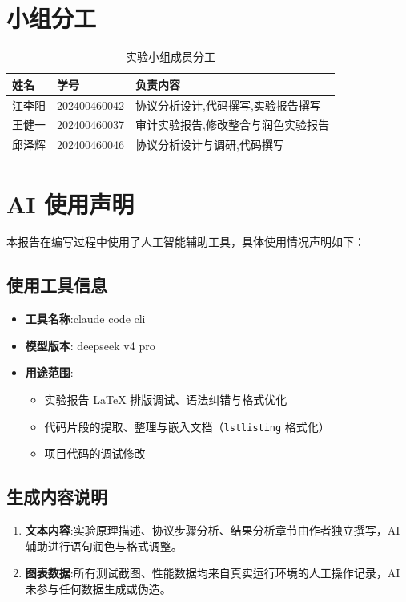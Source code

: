 \appendix
\section{小组分工}

\begin{table}[H]
    \centering
    \caption{实验小组成员分工}
    \begin{tabular}{@{}llp{7cm}@{}}
        \toprule
        \textbf{姓名} & \textbf{学号} & \textbf{负责内容} \\
        \midrule
        江李阳 & 202400460042 & 协议分析设计,代码撰写,实验报告撰写 \\
        王健一 & 202400460037 & 审计实验报告,修改整合与润色实验报告 \\
        邱泽辉 & 202400460046 & 协议分析设计与调研,代码撰写\\
        \bottomrule
    \end{tabular}
\end{table}

\section{AI 使用声明}

本报告在编写过程中使用了人工智能辅助工具，具体使用情况声明如下：

\subsection{使用工具信息}
\begin{itemize}[leftmargin=2em]
    \item \textbf{工具名称}:claude code cli
    \item \textbf{模型版本}: deepseek v4 pro
    \item \textbf{用途范围}:
    \begin{itemize}[leftmargin=2em]
        \item 实验报告 \LaTeX{} 排版调试、语法纠错与格式优化
        \item 代码片段的提取、整理与嵌入文档（\texttt{lstlisting} 格式化）
        \item 项目代码的调试修改
    \end{itemize}
\end{itemize}

\subsection{生成内容说明}
\begin{enumerate}[leftmargin=2em]
    \item \textbf{文本内容}:实验原理描述、协议步骤分析、结果分析章节由作者独立撰写，AI 辅助进行语句润色与格式调整。
    \item \textbf{图表数据}:所有测试截图、性能数据均来自真实运行环境的人工操作记录，AI 未参与任何数据生成或伪造。
\end{enumerate}

